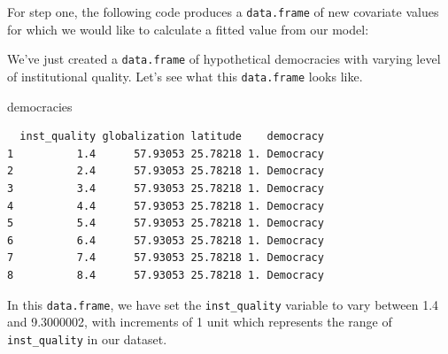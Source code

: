 \documentclass[]{article}
\newenvironment{Shaded}{\begin{snugshade}}{\end{snugshade}}
\newcommand{\DataTypeTok}[1]{\textcolor[rgb]{0.13,0.29,0.53}{#1}}
\newcommand{\DecValTok}[1]{\textcolor[rgb]{0.00,0.00,0.81}{#1}}
\newcommand{\FloatTok}[1]{\textcolor[rgb]{0.00,0.00,0.81}{#1}}
\newcommand{\KeywordTok}[1]{\textcolor[rgb]{0.13,0.29,0.53}{\textbf{#1}}}
\newcommand{\NormalTok}[1]{#1}
\newcommand{\OperatorTok}[1]{\textcolor[rgb]{0.81,0.36,0.00}{\textbf{#1}}}
\newcommand{\StringTok}[1]{\textcolor[rgb]{0.31,0.60,0.02}{#1}}
\begin{document}
For step one, the following code produces a \texttt{data.frame} of new covariate values for which we would like to calculate a fitted value from our model:

\begin{Shaded}
\end{Shaded}

We've just created a \texttt{data.frame} of hypothetical democracies with varying level of institutional quality. Let's see what this \texttt{data.frame} looks like.

\begin{Shaded}
\begin{Highlighting}[]
\NormalTok{democracies}
\end{Highlighting}
\end{Shaded}

\begin{verbatim}
  inst_quality globalization latitude    democracy
1          1.4      57.93053 25.78218 1. Democracy
2          2.4      57.93053 25.78218 1. Democracy
3          3.4      57.93053 25.78218 1. Democracy
4          4.4      57.93053 25.78218 1. Democracy
5          5.4      57.93053 25.78218 1. Democracy
6          6.4      57.93053 25.78218 1. Democracy
7          7.4      57.93053 25.78218 1. Democracy
8          8.4      57.93053 25.78218 1. Democracy
\end{verbatim}

In this \texttt{data.frame}, we have set the \texttt{inst\_quality} variable to vary between 1.4 and 9.3000002, with increments of 1 unit which represents the range of \texttt{inst\_quality} in our dataset.

\begin{Shaded}
\end{Shaded}
\end{document}
